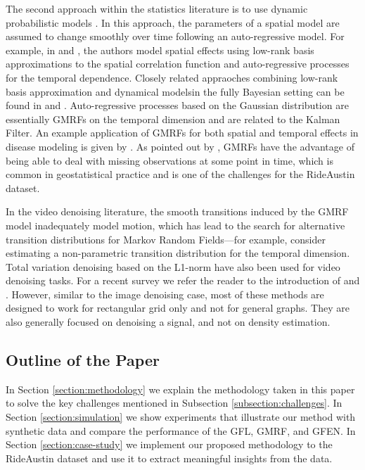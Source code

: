 \documentclass[a4paper, 11pt]{article}
\begin{document}
The second approach within the statistics literature is to use dynamic probabilistic models \citep{stroud-2001}. In this approach, the parameters of a spatial model are assumed to change smoothly over time following an auto-regressive model. For example, in \citep{cressie-2010} and \citep{katzfuss-cressie-2011}, the authors model spatial effects using low-rank basis approximations to the spatial correlation function and auto-regressive processes for the temporal dependence. Closely related appraoches combining low-rank basis approximation and dynamical modelsin the fully Bayesian setting can be found in \citep{katzfuss-cressie-2012} and \citep{finley-2012}. Auto-regressive processes based on the Gaussian distribution are essentially GMRFs on the temporal dimension and are related to the Kalman Filter. An example application of GMRFs for both spatial and temporal effects in disease modeling is given by \citet{rushworth-2017}. As pointed out by \citet{xu-2015}, GMRFs have the advantage of being able to deal with missing observations at some point in time, which is common in geostatistical practice and is one of the challenges for the RideAustin dataset.

In the video denoising literature, the smooth transitions induced by the GMRF model inadequately model motion, which has lead to the search for alternative transition distributions for Markov Random Fields---for example, \citet{chen-tang-2007} consider estimating a non-parametric transition distribution for the temporal dimension. Total variation denoising based on the L1-norm have also been used for video denoising tasks. For a recent survey we refer the reader to the introduction of \citep{arias-morel-2018} and \citep{parisotto-2019}. However, similar to the image denoising case, most of these methods are designed to work for rectangular grid only and not for general graphs. They are also generally focused on denoising a signal, and not on density estimation.



\subsection{Outline of the Paper}

In Section \ref{section:methodology} we explain the methodology taken in this paper to solve the key challenges mentioned in Subsection \ref{subsection:challenges}. In Section \ref{section:simulation} we show experiments that illustrate our method with synthetic data and compare the performance of the GFL, GMRF, and GFEN. In Section \ref{section:case-study} we implement our proposed methodology to the RideAustin dataset and use it to extract meaningful insights from the data.
\end{document}
